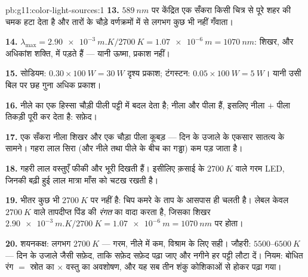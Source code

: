 \begin{solution}{pb:g11:color-light-sources:1}
\textbf{13.} $\qty{589}{nm}$ पर केंद्रित एक सँकरा  किसी चित्र से
पूरे शहर की चमक हटा देता है और तारों के चौड़े वर्णक्रमों में से लगभग कुछ
भी नहीं गँवाता।

\textbf{14.} $\lambda_{\max} = \qty{2.90e-3}{m.K}/\qty{2700}{K} =
\qty{1.07e-6}{m} = \qty{1070}{nm}$: शिखर, और अधिकांश शक्ति,
 में पड़ते हैं --- यानी ऊष्मा, प्रकाश नहीं।

\textbf{15.} सोडियम: $0.30 \times \qty{100}{W} = \qty{30}{W}$ दृश्य प्रकाश; टंगस्टन: $0.05 \times \qty{100}{W} = \qty{5}{W}$। यानी उसी
बिल पर छह गुना अधिक प्रकाश।

\textbf{16.}  नीले का एक हिस्सा चौड़ी पीली
पट्टी में बदल देता है; नीला और पीला  हैं, इसलिए नीला $+$ पीला
तिकड़ी पूरी कर देता है: सफ़ेद।

\textbf{17.} एक सँकरा नीला शिखर और एक चौड़ा पीला कूबड़ --- दिन के उजाले
के एकसार सातत्य के सामने। गहरा लाल सिरा (और नीले तथा पीले के बीच का
गड्ढा) कम पड़ जाता है।

\textbf{18.} गहरी लाल वस्तुएँ फीकी और भूरी दिखती हैं। इसीलिए क़साई के
$\qty{2700}{K}$ वाले गरम LED, जिनकी बढ़ी हुई लाल मात्रा माँस को चटख रखती है।

\textbf{19.} भीतर कुछ भी $\qty{2700}{K}$ पर नहीं है: चिप कमरे के ताप के आसपास ही
चलती है। लेबल केवल $\qty{2700}{K}$ वाले तापदीप्त पिंड की \emph{रंगत} का वादा
करता है, जिसका शिखर $\qty{2.90e-3}{m.K}/\qty{2700}{K} = \qty{1.07e-6}{m} = \qty{1070}{nm}$ पर होता।

\textbf{20.} शयनकक्ष: लगभग $\qty{2700}{K}$ --- गरम, नीले में कम, विश्राम के लिए
सही। जौहरी: $5500$--$\qty{6500}{K}$ --- दिन के उजाले जैसी सफ़ेद, ताकि सफ़ेद
सफ़ेद पढ़ा जाए और नगीने हर पट्टी लौटा दें। नियम: बोधित रंग $=$ स्रोत
का  $\times$ वस्तु का अवशोषण, और यह सब तीन
शंकु कोशिकाओं से होकर पढ़ा गया।
\end{solution}
